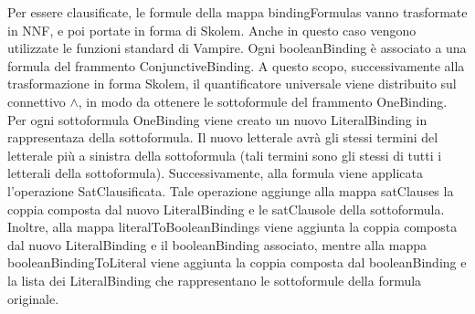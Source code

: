\documentclass[./main.tex]{subfiles}
\begin{document}
Per essere clausificate, le formule della mappa bindingFormulas vanno trasformate in NNF, e poi portate in forma di Skolem.
Anche in questo caso vengono utilizzate le funzioni standard di Vampire. 
Ogni booleanBinding è associato a una formula del frammento ConjunctiveBinding.
A questo scopo, successivamente alla trasformazione in forma Skolem, il quantificatore universale viene distribuito sul connettivo $\land$, in modo da ottenere le sottoformule del frammento OneBinding.
Per ogni sottoformula OneBinding viene creato un nuovo LiteralBinding in rappresentaza della sottoformula.
Il nuovo letterale avrà gli stessi termini del letterale più a sinistra della sottoformula (tali termini sono gli stessi di tutti i letterali della sottoformula).
Successivamente, alla formula viene applicata l'operazione SatClausificata. 
Tale operazione aggiunge alla mappa satClauses la coppia composta dal nuovo LiteralBinding e le satClausole della sottoformula.
Inoltre, alla mappa literalToBooleanBindings viene aggiunta la coppia composta dal nuovo LiteralBinding e il booleanBinding associato, mentre alla mappa
booleanBindingToLiteral viene aggiunta la coppia composta dal booleanBinding e la lista dei LiteralBinding che rappresentano le sottoformule della formula originale.  


\end{document}
